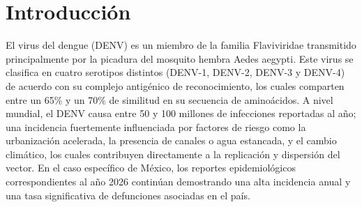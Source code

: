 \titleformat{\chapter}[display]
  {\normalfont\bfseries}{}{0pt}{\Large} %
\chapter*{Introducción}
El virus del dengue (DENV) es un miembro de la familia Flaviviridae transmitido principalmente por la picadura del mosquito hembra Aedes aegypti. Este virus se clasifica en cuatro serotipos distintos (DENV-1, DENV-2, DENV-3 y DENV-4) de acuerdo con su complejo antigénico de reconocimiento, los cuales comparten entre un 65\% y un 70\% de similitud en su secuencia de aminoácidos. A nivel mundial, el DENV causa entre 50 y 100 millones de infecciones reportadas al año; una incidencia fuertemente influenciada por factores de riesgo como la urbanización acelerada, la presencia de canales o agua estancada, y el cambio climático, los cuales contribuyen directamente a la replicación y dispersión del vector. En el caso específico de México, los reportes epidemiológicos correspondientes al año 2026 continúan demostrando una alta incidencia anual y una tasa significativa de defunciones asociadas en el país.
